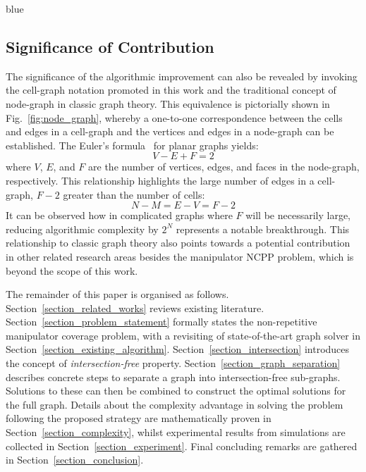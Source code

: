 \documentclass[journal]{IEEEtran}
\begin{document}
\begin{color}{blue}
\subsection{Significance of Contribution}
\end{color}

The significance of the algorithmic improvement can also be revealed by invoking the cell-graph notation promoted in this work and the traditional concept of node-graph in classic graph theory. This equivalence is pictorially shown in Fig.~\ref{fig:node_graph}, whereby a one-to-one correspondence between the cells and edges in a cell-graph and the vertices and edges in a node-graph can be established. The Euler's formula~\cite{Bondy1976Graph} for planar graphs yields: 
\begin{equation}
V - E + F = 2
\end{equation}
where $V$, $E$, and $F$ are the number of vertices, edges, and faces in the node-graph, respectively. 
This relationship highlights the large number of edges in a cell-graph, $F-2$ greater than the number of cells: 
\begin{equation}
N - M = E - V = F - 2
\end{equation} 
It can be observed how in complicated graphs where $F$ will be necessarily large, reducing algorithmic complexity by $2^N$ represents a notable breakthrough. 
This relationship to classic graph theory also points towards a potential contribution in other related research areas besides the manipulator NCPP problem, which is beyond the scope of this work. 


The remainder of this paper is organised as follows. 
Section~\ref{section_related_works} reviews existing literature. 
Section~\ref{section_problem_statement} formally states the non-repetitive manipulator coverage problem, with a revisiting of state-of-the-art graph solver in Section~\ref{section_existing_algorithm}. 
Section~\ref{section_intersection} introduces the concept of \textit{intersection-free} property.
Section~\ref{section_graph_separation} describes concrete steps to separate a graph into intersection-free sub-graphs. 
Solutions to these can then be combined to construct the optimal solutions for the full graph. 
Details about the complexity advantage in solving the problem following the proposed strategy are mathematically proven in Section~\ref{section_complexity}, whilst experimental results from simulations are collected in Section~\ref{section_experiment}. Final concluding remarks are gathered in Section~\ref{section_conclusion}.
\end{document}
